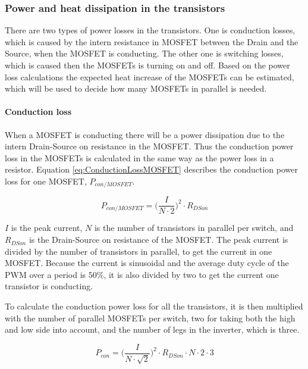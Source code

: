 \subsubsection{Power and heat dissipation in the transistors}
There are two types of power losses in the transistors. One is conduction losses, which is caused by the intern resistance in MOSFET between the Drain and the Source, when the MOSFET is conducting. The other one is switching losses, which is caused then the MOSFETs is turning on and off. Based on the power loss calculations the expected heat increase of the MOSFETs can be estimated, which will be used to decide how many MOSFETs in parallel is needed.

\paragraph{Conduction loss}
When a MOSFET is conducting there will be a power dissipation due to the intern Drain-Source on resistance in the MOSFET. Thus the conduction power loss in the MOSFETs is calculated in the same way as the power loss in a resistor. Equation \ref{eq:ConductionLossMOSFET} describes the conduction power loss for one MOSFET, $P_{con/MOSFET}$.

    \begin{equation}
        P_{con/MOSFET} = \bigg( \frac{I}{N \cdot 2} \bigg) ^2 \cdot R_{DSon}
        \label{eq:ConductionLossMOSFET}
    \end{equation}

$I$ is the peak current, $N$ is the number of transistors in parallel per switch, and $R_{DSon}$ is the Drain-Source on resistance of the MOSFET.
The peak current is divided by the number of transistors in parallel, to get the current in one MOSFET. Because the current is sinusoidal and the average duty cycle of the PWM over a period is $50 \% $, it is also divided by two to get the current one transistor is conducting.

To calculate the conduction power loss for all the transistors, it is then multiplied with the number of parallel MOSFETs per switch, two for taking both the high and low side into account, and the number of legs in the inverter, which is three.

    \begin{equation}
        P_{con} = \bigg( \frac{I}{N \cdot \sqrt{2}} \bigg) ^2 \cdot R_{DSon} \cdot N \cdot 2 \cdot 3
        \label{eq:ConductionLossTot}
    \end{equation}

